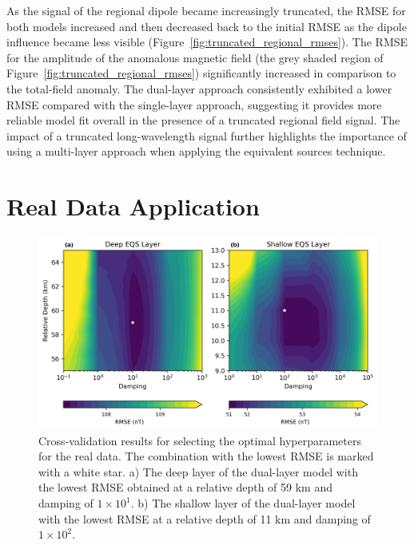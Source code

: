 As the signal of the regional dipole became increasingly truncated, the RMSE for both models increased and then decreased back to the initial RMSE as the dipole influence became less visible (Figure~\ref{fig:truncated_regional_rmses}). The RMSE for the amplitude of the anomalous magnetic field (the grey shaded region of Figure~\ref{fig:truncated_regional_rmses}) significantly increased in comparison to the total-field anomaly. The dual-layer approach consistently exhibited a lower RMSE compared with the single-layer approach, suggesting it provides more reliable model fit overall in the presence of a truncated regional field signal. The impact of a truncated long-wavelength signal further highlights the importance of using a multi-layer approach when applying the equivalent sources technique.


\section{Real Data Application}
\label{sec:real_application}

\begin{figure}[tb!]
\centering
\includegraphics[width=1\linewidth]{figures/cv_real.png}
\caption{
    Cross-validation results for selecting the optimal hyperparameters for the real data. The combination with the lowest RMSE is marked with a white star. a) The deep layer of the dual-layer model with the lowest RMSE obtained at a relative depth of 59 km and damping of $1 \times 10^1$. b) The shallow layer of the dual-layer model with the lowest RMSE at a relative depth of 11 km and damping of $1 \times 10^2$.
}
\label{fig:cv_real}
\end{figure}

